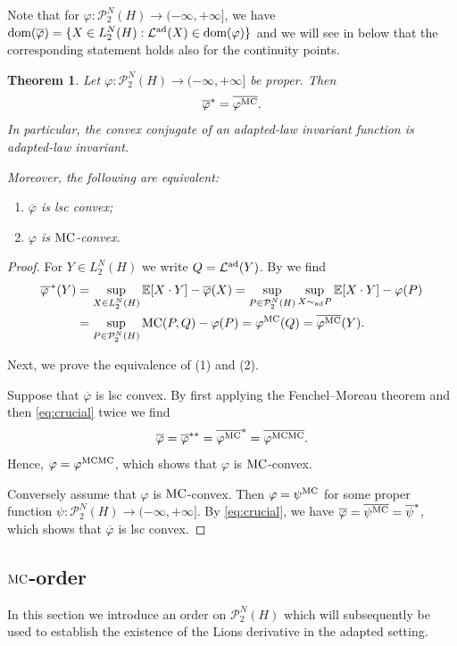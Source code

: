 \documentclass[a4paper]{amsart}
\newtheorem{theorem}{Theorem}
\numberwithin{theorem}{section}
\theoremstyle{definition}
\newcommand{\E}{\mathbb{E}}
\newcommand{\law}{\mathcal{L}}
\newcommand{\dom}{\textup{dom}}
\newcommand{\Pc}{\mathcal P}
\newcommand{\simad}{\sim_{\mathrm{ad}}}
\renewcommand{\H}{H}
\renewcommand{\phi}{\varphi}
\newcommand{\mc}{\textup{MC}}
\newcommand{\MC}{\textup{MC}}
\newcommand{\lawad}{\law^{\textup{ad}}}
\begin{document}
Note that for $\phi : \Pc_2^N(\H) \to (-\infty, +\infty]$, we  have 
$ 
\dom(\overline{\phi}) = \{ X \in L_2^N(H) : \lawad(X) \in \dom(\phi) \} 
$ and we  will see in  below that the corresponding statement holds also for the continuity points. 
\begin{theorem}\label{thm:MC_trafo_ast_ad}
Let $\phi : \Pc_2^N(\H) \to (-\infty, +\infty]$ be proper. Then 
\begin{align}\label{eq:crucial}
  \overline{\phi}^\ast = \overline{\phi^{\mc}}.  
\end{align}
In particular, the convex conjugate of an adapted-law invariant function is adapted-law invariant.

Moreover, the following are equivalent:
\begin{enumerate}
    \item $\overline{\phi}$ is lsc convex;
    \item $\phi$ is $\mc$-convex.
\end{enumerate}
\end{theorem}
\begin{proof}
For $Y \in L_2^N(\H)$ we write $Q =\lawad(Y)$. By  we find
\begin{align*}
   \overline{\phi\,}^\ast(Y) &= \sup_{X \in L_2^N(H) } \E[ X \cdot Y ] - \overline{\phi}(X) = \sup_{ P \in \Pc_2^N(\H)}  \sup_{X \simad P} \E[X \cdot Y]   -  \phi(P) \\
   &= \sup_{P \in \Pc_2^N(\H) } \mc(P,Q) - \phi(P)  = \phi^{\mc}(Q) = \overline{\phi^{\mc}}(Y).
\end{align*}

Next, we prove the equivalence of (1) and (2).

Suppose that $\overline{\phi}$ is lsc convex. By first applying the Fenchel--Moreau theorem and then \eqref{eq:crucial} twice we find
\[
\overline{\phi} = \overline{\phi}^{\ast\ast} = \overline{\phi^\mc}^\ast = \overline{\phi^{\mc\mc}}.
\]
Hence, $\phi = \phi^{\mc\mc}$, which shows that $\phi$ is $\mc$-convex. 

Conversely assume that $\phi$ is $\mc$-convex. Then $\phi = \psi^{\mc}$ for some proper function $\psi : \Pc_2^N(\H) \to (-\infty,+\infty]$. By \eqref{eq:crucial}, we have $\overline{\phi} = \overline{\psi^\mc} = \overline{\psi}^\ast$, which shows that $\overline{\phi}$ is lsc convex. 
\end{proof}



\subsection{$\MC$-order}
In this section we introduce an order on $\Pc_2^N(H)$  which will subsequently be  used to establish the existence of the Lions derivative in the adapted setting. 
\end{document}
